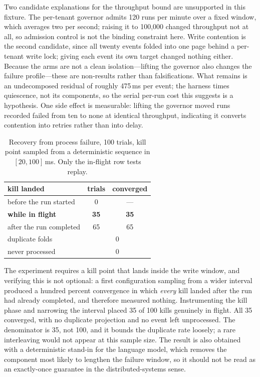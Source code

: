 \documentclass[journal,nofonttune]{IEEEtran}
\begin{document}
Two candidate explanations for the throughput bound are unsupported in this
fixture. The per-tenant governor admits 120 runs per minute over a fixed
window, which averages two per second; raising it to 100{,}000 changed
throughput not at all, so admission control is not the binding constraint
here. Write contention is the second candidate, since all twenty events
folded into one page behind a per-tenant write lock; giving each event its
own target changed nothing either. Because the arms are not a clean
isolation---lifting the governor also changes the failure profile---these are
non-results rather than falsifications. What remains is an undecomposed
residual of roughly 475\,ms per event; the harness times quiescence, not its
components, so the serial per-run cost this suggests is a hypothesis. One
side effect is measurable: lifting the governor moved runs recorded failed
from ten to none at identical throughput, indicating it converts contention
into retries rather than into delay.

\begin{table}[!t]
\caption{Recovery from process failure, 100 trials, kill point sampled from a
deterministic sequence in $[20,100]$\,ms. Only the in-flight row tests
replay.}
\label{tab:replay}
\centering
\footnotesize
\begin{tabular}{lcc}
\toprule
kill landed & trials & converged \\
\midrule
before the run started   & 0  & --- \\
\textbf{while in flight} & \textbf{35} & \textbf{35} \\
after the run completed  & 65 & 65 \\
\midrule
duplicate folds & \multicolumn{2}{c}{0} \\
never processed & \multicolumn{2}{c}{0} \\
\bottomrule
\end{tabular}
\end{table}

The experiment requires a kill point that lands inside the write window, and
verifying this is not optional: a first configuration sampling from a wider
interval produced a hundred percent convergence in which \emph{every} kill
landed after the run had already completed, and therefore measured nothing.
Instrumenting the kill phase and narrowing the interval placed 35 of 100
kills genuinely in flight. All 35 converged, with no duplicate projection and
no event left unprocessed. The denominator is 35, not 100, and it bounds the
duplicate rate loosely; a rare interleaving would not appear at this sample
size. The result is also obtained with a deterministic stand-in for the
language model, which removes the component most likely to lengthen the
failure window, so it should not be read as an exactly-once guarantee in the
distributed-systems sense.
\end{document}
